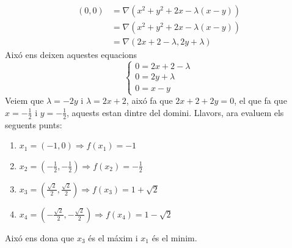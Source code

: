 \documentclass[a4paper, 12pt]{article}
\begin{document}
\begin{solucio}
\begin{displaymath}
\begin{split}
                \left(0,0\right) &= \nabla\left(x^2+y^2+2x - \lambda\left(x-y\right)\right)\\
                &= \nabla\left(x^2+y^2+2x - \lambda\left(x-y\right)\right)\\
                &= \nabla\left(2x+2 - \lambda, 2y + \lambda\right)
            \end{split}
        \end{displaymath}
        Aixó ens deixen aquestes equacions
        \begin{displaymath}
            \begin{cases}
                0 = 2x+2-\lambda\\
                0 = 2y+\lambda\\
                0 = x-y
            \end{cases}
        \end{displaymath}
        Veiem que $\lambda = -2y$ i $\lambda = 2x+2$, aixó fa que $2x+2+2y = 0$, el que fa que
        $x=-\frac{1}{2}$ i $y = -\frac{1}{2}$, aquests estan dintre del domini.
        Llavors, ara evaluem els seguents punts:
        \begin{enumerate}
            \item $x_1 = \left(-1, 0\right) \Rightarrow f(x_1) = -1$
            \item $x_2 = \left(-\frac{1}{2}, -\frac{1}{2}\right) \Rightarrow f(x_2) = -\frac{1}{2}$
            \item $x_3 = \left(\frac{\sqrt{2}}{2}, \frac{\sqrt{2}}{2}\right) \Rightarrow f(x_3) = 1+\sqrt{2}$
            \item $x_4 = \left(-\frac{\sqrt{2}}{2}, -\frac{\sqrt{2}}{2}\right) \Rightarrow f(x_4) = 1-\sqrt{2}$
        \end{enumerate}
        Aixó ens dona que $x_3$ és el máxim i $x_1$ és el minim. 
    \end{solucio}
    
\end{document}
